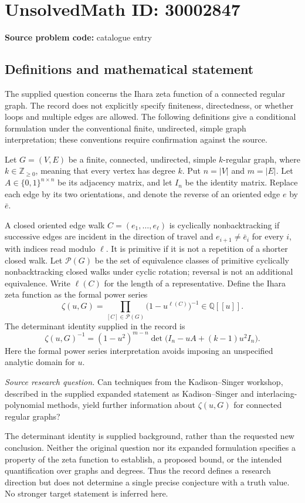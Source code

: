 \documentclass[11pt]{article}
\newcommand{\Z}{\mathbb{Z}}
\newcommand{\Q}{\mathbb{Q}}
\begin{document}
\section*{UnsolvedMath ID: 30002847}
\textbf{Source problem code:} catalogue entry
\subsection{Definitions and mathematical statement}
The supplied question concerns the Ihara zeta function of a connected regular graph. The record does not explicitly specify finiteness, directedness, or whether loops and multiple edges are allowed. The following definitions give a conditional formulation under the conventional finite, undirected, simple graph interpretation; these conventions require confirmation against the source.

Let \(G=(V,E)\) be a finite, connected, undirected, simple \(k\)-regular graph, where \(k\in\Z_{\geq 0}\), meaning that every vertex has degree \(k\). Put \(n=|V|\) and \(m=|E|\). Let \(A\in\{0,1\}^{n\times n}\) be its adjacency matrix, and let \(I_n\) be the identity matrix. Replace each edge by its two orientations, and denote the reverse of an oriented edge \(e\) by \(\bar e\).

A closed oriented edge walk \(C=(e_1,\ldots,e_\ell)\) is cyclically nonbacktracking if successive edges are incident in the direction of travel and \(e_{i+1}\ne\bar e_i\) for every \(i\), with indices read modulo \(\ell\). It is primitive if it is not a repetition of a shorter closed walk. Let \(\mathcal P(G)\) be the set of equivalence classes of primitive cyclically nonbacktracking closed walks under cyclic rotation; reversal is not an additional equivalence. Write \(\ell(C)\) for the length of a representative. Define the Ihara zeta function as the formal power series
\[
\zeta(u,G)=\prod_{[C]\in\mathcal P(G)}\bigl(1-u^{\ell(C)}\bigr)^{-1}\in\Q[[u]].
\]
The determinant identity supplied in the record is
\[
\zeta(u,G)^{-1}=(1-u^2)^{m-n}\det\!\bigl(I_n-uA+(k-1)u^2I_n\bigr).
\]
Here the formal power series interpretation avoids imposing an unspecified analytic domain for \(u\).

\emph{Source research question.} Can techniques from the Kadison--Singer workshop, described in the supplied expanded statement as Kadison--Singer and interlacing-polynomial methods, yield further information about \(\zeta(u,G)\) for connected regular graphs?

The determinant identity is supplied background, rather than the requested new conclusion. Neither the original question nor its expanded formulation specifies a property of the zeta function to establish, a proposed bound, or the intended quantification over graphs and degrees. Thus the record defines a research direction but does not determine a single precise conjecture with a truth value. No stronger target statement is inferred here.
\end{document}
